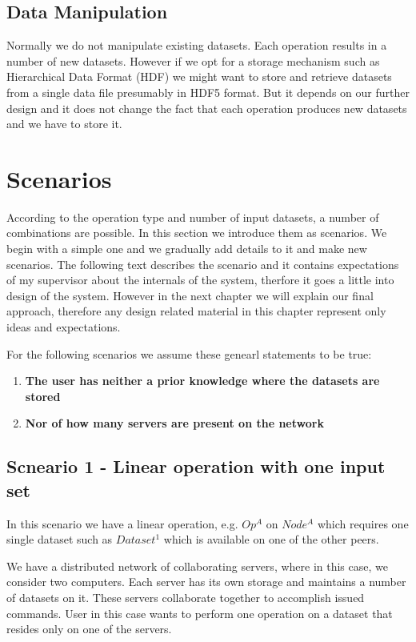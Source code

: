 \subsection{Data Manipulation}
Normally we do not manipulate existing datasets. Each operation results in a number of new datasets. However if we
opt for a storage mechanism such as Hierarchical Data Format (HDF) we might want to store and retrieve datasets from
a single data file presumably in HDF5 format. But it depends on our further design and it does not change the fact
that each operation produces new datasets and we have to store it.


\section{Scenarios}
According to the operation type and number of input datasets, a number of combinations are possible.
In this section we introduce them as scenarios. We begin with a simple one and we gradually add details 
to it and make new scenarios. The following text describes the scenario and it contains expectations of 
my supervisor about the internals of the system, therfore it goes a little into design of the system. 
However in the next chapter we will explain our final approach, therefore any design related material in
this chapter represent only ideas and expectations.%

For the following scenarios we assume these genearl statements to be true:
\begin{enumerate}
\item \textbf{The user has neither a prior knowledge where the datasets are stored}
\item \textbf{Nor of how many servers are present on the network}
\end{enumerate}

\subsection{Scneario 1 - Linear operation with one input set}
\label{sc:sc1}
In this scenario we have a linear operation, e.g. \(Op^A\) on \(Node^A\) which
requires one single dataset such as \( Dataset^1 \) which is available on one of the other peers.

We have a distributed network of collaborating servers, where in this case, we consider two computers. 
Each server has its own storage and maintains a number of datasets on it. These servers collaborate 
together to accomplish issued commands. User in this case wants to perform one operation on a dataset
that resides only on one of the servers. 

